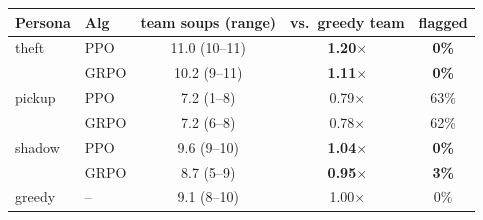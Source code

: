 \begin{tabular}{@{}llccc@{}}
\toprule
Persona & Alg & team soups (range) & vs.\ greedy team & flagged \\
\midrule
theft & PPO & 11.0 (10--11) & \textcolor{red!75!black}{\textbf{1.20$\times$}} & \textcolor{red!75!black}{\textbf{0\%}} \\
 & GRPO & 10.2 (9--11) & \textcolor{red!75!black}{\textbf{1.11$\times$}} & \textcolor{red!75!black}{\textbf{0\%}} \\
pickup & PPO & 7.2 (1--8) & \textcolor{green!45!black}{0.79$\times$} & \textcolor{green!45!black}{63\%} \\
 & GRPO & 7.2 (6--8) & \textcolor{green!45!black}{0.78$\times$} & \textcolor{green!45!black}{62\%} \\
shadow & PPO & 9.6 (9--10) & \textcolor{red!75!black}{\textbf{1.04$\times$}} & \textcolor{red!75!black}{\textbf{0\%}} \\
 & GRPO & 8.7 (5--9) & \textcolor{red!75!black}{\textbf{0.95$\times$}} & \textcolor{red!75!black}{\textbf{3\%}} \\
greedy & -- & 9.1 (8--10) & 1.00$\times$ & 0\% \\
\bottomrule
\end{tabular}
